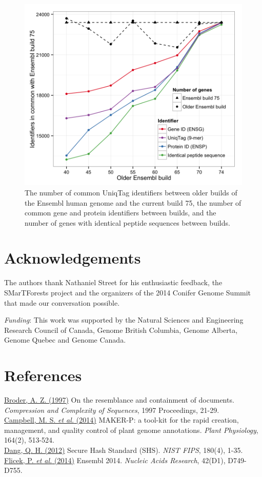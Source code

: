 \documentclass{bioinfo}
\begin{document}
\begin{figure}[htbp]
\centering
\includegraphics{ensembl.png}
\caption{The number of common UniqTag identifiers between older builds
of the Ensembl human genome and the current build 75, the number of
common gene and protein identifiers between builds, and the number of
genes with identical peptide sequences between builds.}
\end{figure}

\section*{Acknowledgements}\label{acknowledgements}

The authors thank Nathaniel Street for his enthusiastic feedback, the
SMarTForests project and the organizers of the 2014 Conifer Genome
Summit that made our conversation possible.

\emph{Funding}: This work was supported by the Natural Sciences and
Engineering Research Council of Canada, Genome British Columbia, Genome
Alberta, Genome Quebec and Genome Canada.

\section*{References}\label{references}

\href{http://dx.doi.org/10.1109/SEQUEN.1997.666900}{Broder, A. Z.
(1997)} On the resemblance and containment of documents.
\emph{Compression and Complexity of Sequences}, 1997 Proceedings,
21-29.\\\href{http://dx.doi.org/10.1104/pp.113.230144}{Campbell, M. S.
\emph{et al.} (2014)} MAKER-P: a tool-kit for the rapid creation,
management, and quality control of plant genome annotations. \emph{Plant
Physiology}, 164(2),
513-524.\\\href{http://www.nist.gov/manuscript-publication-search.cfm?pub_id=910977}{Dang,
Q. H. (2012)} Secure Hash Standard (SHS). \emph{NIST FIPS}, 180(4),
1-35.\\\href{http://dx.doi.org/10.1093/nar/gkt1196}{Flicek, P. \emph{et
al.} (2014)} Ensembl 2014. \emph{Nucleic Acids Research}, 42(D1),
D749-D755.
\end{document}

